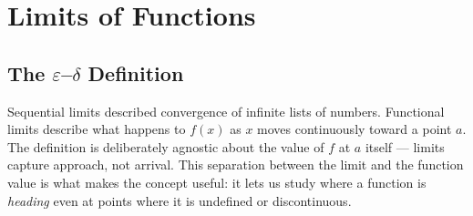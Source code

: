 \documentclass[12pt, openany]{book}
\theoremstyle{plain}
\theoremstyle{definition}
\theoremstyle{remark}
\newcommand{\eps}{\varepsilon}
\newcommand{\del}{\delta}
\begin{document}
\chapter{Limits of Functions}
\color{black}

\section{The \texorpdfstring{$\eps$--$\del$}{epsilon-delta} Definition}

Sequential limits described convergence of infinite lists of numbers.  Functional limits describe what happens to $f(x)$ as $x$ moves continuously toward a point $a$.  The definition is deliberately agnostic about the value of $f$ at $a$ itself --- limits capture approach, not arrival.  This separation between the limit and the function value is what makes the concept useful: it lets us study where a function is \emph{heading} even at points where it is undefined or discontinuous.
\end{document}
